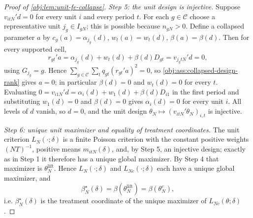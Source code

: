 \begin{proof}[Proof of \cref{obj:lem:unit-fe-collapse}]
\textit{Step 5: the unit design is injective.} Suppose \(v_{itN}'d=0\) for every unit \(i\) and every period \(t\). For each \(g\in\mathcal C\) choose a representative unit \(j_g\in I_{gN}\); this is possible because \(n_{gN}>0\). Define a collapsed parameter \(a\) by \(c_g(a)=\alpha_{j_g}(d)\), \(w_t(a)=w_t(d)\), \(\beta(a)=\beta(d)\). Then for every supported cell,
\[
r_{gt}'a
=
\alpha_{j_g}(d)+w_t(d)+\beta(d)D_{gt}
=
v_{j_gtN}'d
=
0,
\]
using \(G_{j_g}=g\). Hence \(\sum_{g\in\mathcal C}\sum_t q_{gt}(r_{gt}'a)^2=0\), so \cref{obj:ass:collapsed-design-rank} gives \(a=0\); in particular \(\beta(d)=0\) and \(w_t(d)=0\) for every \(t\). Evaluating \(0=v_{i1N}'d=\alpha_i(d)+w_1(d)+\beta(d)D_{i1}\) in the first period and substituting \(w_1(d)=0\) and \(\beta(d)=0\) gives \(\alpha_i(d)=0\) for every unit \(i\). All levels of \(d\) vanish, so \(d=0\), and the unit design \(\theta_N\mapsto(v_{itN}'\theta_N)_{i,t}\) is injective.

\textit{Step 6: unique unit maximizer and equality of treatment coordinates.} The unit criterion \(L_N(\cdot;\delta)\) is a finite Poisson criterion with the constant positive weights \((NT)^{-1}\), positive means \(m_{itN}(\delta)\), and, by Step 5, an injective design; exactly as in Step 1 it therefore has a unique global maximizer. By Step 4 that maximizer is \(\theta_N^{\text{lift}}\). Hence \(L_N(\cdot;\delta)\) and \(L_{Nc}(\cdot;\delta)\) each have a unique global maximizer, and
\[
\beta_N^\star(\delta)=\beta(\theta_N^{\text{lift}})=\beta(\theta_N^c),
\]
i.e. \(\beta_N^\star(\delta)\) is the treatment coordinate of the unique maximizer of \(L_{Nc}(\theta;\delta)\).


\end{proof}
